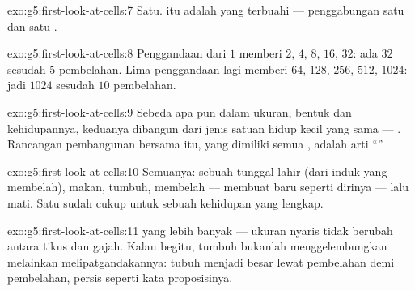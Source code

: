\begin{solution}{exo:g5:first-look-at-cells:7}
Satu.  itu adalah  yang terbuahi --- penggabungan satu  dan satu .
\end{solution}

\begin{solution}{exo:g5:first-look-at-cells:8}
Penggandaan dari $1$ memberi $2$, $4$, $8$, $16$, $32$: ada $32$ 
sesudah $5$ pembelahan. Lima penggandaan lagi memberi $64$, $128$,
$256$, $512$, $1024$: jadi $1024$  sesudah $10$ pembelahan.
\end{solution}

\begin{solution}{exo:g5:first-look-at-cells:9}
Sebeda apa pun dalam ukuran, bentuk dan kehidupannya, keduanya
dibangun dari jenis satuan hidup kecil yang sama --- . Rancangan
pembangunan bersama itu, yang dimiliki semua , adalah
arti ``''.
\end{solution}

\begin{solution}{exo:g5:first-look-at-cells:10}
Semuanya: sebuah  tunggal lahir (dari  induk yang membelah),
makan, tumbuh, membelah --- membuat  baru seperti dirinya
--- lalu mati. Satu  sudah cukup untuk sebuah kehidupan yang
lengkap.
\end{solution}

\begin{solution}{exo:g5:first-look-at-cells:11}
 yang lebih banyak --- ukuran  nyaris tidak berubah antara tikus
dan gajah. Kalau begitu, tumbuh bukanlah menggelembungkan 
melainkan melipatgandakannya: tubuh menjadi besar lewat pembelahan
demi pembelahan, persis seperti kata proposisinya.
\end{solution}
